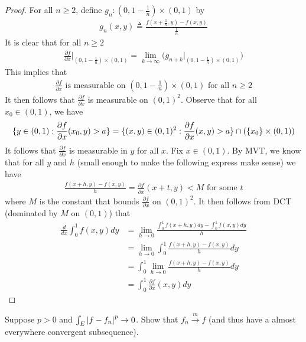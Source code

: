 \documentclass{report}
\begin{document}
\begin{proof}
For all $n\geq 2$, define $g_n:(0,1-\frac{1}{n})\times (0,1)$ by 
\begin{align*}
g_n(x,y)\triangleq \frac{f(x+\frac{1}{n},y)-f(x,y)}{\frac{1}{n}}
\end{align*}
It is clear that for all $n\geq 2$
\begin{align*}
\frac{\partial f}{\partial x}\Big|_{(0,1 -\frac{1}{n})\times (0,1)}= \lim_{k\to \infty}\Big( g_{n+k}\Big|_{(0,1-\frac{1}{n})\times (0,1)} \Big)
\end{align*}
This implies that 
\begin{align*}
\frac{\partial f}{\partial x}\text{ is measurable on }(0,1-\frac{1}{n})\times (0,1)\text{ for all }n\geq 2
\end{align*}
It then follows that $\frac{\partial f}{\partial x}$ is measurable on $(0,1)^2$. Observe that for all $x_0\in (0,1)$, we have 
\begin{align*}
\{ y\in (0,1): \frac{\partial f}{\partial x}(x_0,y)>a \}= \{ (x,y)\in (0,1)^2 : \frac{\partial f}{\partial x}(x,y)>a \}\cap (\{ x_0 \}\times (0,1)) 
\end{align*}
It follows that $\frac{\partial f}{\partial x}$ is measurable in $y$ for all  $x$. Fix $x \in (0,1)$. By MVT, we know that for all $y$ and $h$  (small enough to make the following express make sense) we have
\begin{align*}
\frac{f(x+h,y)-f(x,y)}{h}= \frac{\partial f}{\partial x}(x+t,y) < M\text{ for some }t
\end{align*}
where $M$ is the constant that bounds  $\frac{\partial f}{\partial x}$ on $(0,1)^2$. It then follows from DCT (dominated by $M$ on  $(0,1)$) that 
\begin{align*}
\frac{d}{dx} \int_0^1 f(x,y)dy &= \lim_{h\to 0} \frac{\int_0^1 f(x+h,y)dy-\int_0^1f(x,y)dy}{h} \\
&=\lim_{h\to 0} \int_0^1 \frac{f(x+h,y)-f(x,y)}{h}dy \\
&=\int_0^1 \lim_{h\to 0} \frac{f(x+h,y)-f(x,y)}{h}dy \\
&=\int_0^1 \frac{\partial f}{\partial x}(x,y)dy
\end{align*}



\end{proof}
\begin{question}{}{}
Suppose $p>0$ and $\int_E \left|f-f_n\right|^p \to 0$. Show that $f_n \overset{m}{\to} f$ (and thus have a almost everywhere convergent subsequence). 
\end{question}
\end{document}
